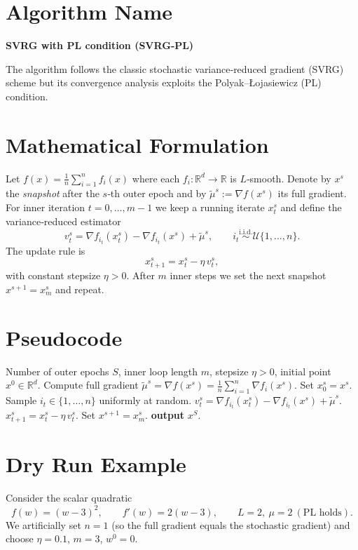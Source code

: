 \documentclass{article}
\newcommand{\RR}{\mathbb{R}}
\newcommand{\grad}{\nabla}
\begin{document}
\section*{Algorithm Name}
\textbf{SVRG with PL condition (SVRG‑PL)}  

The algorithm follows the classic stochastic variance‑reduced gradient (SVRG) scheme
but its convergence analysis exploits the Polyak–\L ojasiewicz (PL) condition.

\section*{Mathematical Formulation}
Let $f(x)=\frac{1}{n}\sum_{i=1}^{n} f_i(x)$ where each $f_i:\RR^d\to\RR$ is $L$‑smooth.
Denote by $x^{s}$ the \emph{snapshot} after the $s$‑th outer epoch and by
$\tilde{\mu}^{s}:=\grad f(x^{s})$ its full gradient.  
For inner iteration $t=0,\dots,m-1$ we keep a running iterate $x_{t}^{s}$ and
define the variance‑reduced estimator
\[
v_{t}^{s}= \grad f_{i_t}(x_{t}^{s})-\grad f_{i_t}(x^{s})+\tilde{\mu}^{s},
\qquad i_t\stackrel{\text{i.i.d.}}{\sim}\mathcal{U}\{1,\dots,n\}.
\]
The update rule is
\[
x_{t+1}^{s}=x_{t}^{s}-\eta\, v_{t}^{s},
\tag{1}
\]
with constant stepsize $\eta>0$.  
After $m$ inner steps we set the next snapshot $x^{s+1}=x_{m}^{s}$ and repeat.

\section*{Pseudocode}
\begin{algorithm}[H]
\caption{SVRG‑PL}
\begin{algorithmic}[1]
\Require Number of outer epochs $S$, inner loop length $m$, stepsize $\eta>0$, initial point $x^{0}\in\RR^{d}$.
    \State Compute full gradient $\tilde{\mu}^{s}= \grad f(x^{s})=\frac1n\sum_{i=1}^{n}\grad f_i(x^{s})$.
    \State Set $x_{0}^{s}=x^{s}$.
        \State Sample $i_t\in\{1,\dots,n\}$ uniformly at random.
        \State $v_{t}^{s}= \grad f_{i_t}(x_{t}^{s})-\grad f_{i_t}(x^{s})+\tilde{\mu}^{s}$.
        \State $x_{t+1}^{s}= x_{t}^{s}-\eta\, v_{t}^{s}$.
    \EndFor
    \State Set $x^{s+1}=x_{m}^{s}$.
\EndFor
\State \textbf{output} $x^{S}$.
\end{algorithmic}
\end{algorithm}

\section*{Dry Run Example}
Consider the scalar quadratic
\[
f(w)=(w-3)^{2},\qquad f'(w)=2(w-3),\qquad L=2,\ \mu=2\ (\text{PL holds}).
\]
We artificially set $n=1$ (so the full gradient equals the stochastic gradient) and
choose $\eta=0.1$, $m=3$, $w^{0}=0$.
\end{document}
